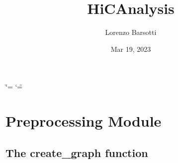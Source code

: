 \documentclass[letterpaper,10pt,english]{sphinxmanual}
\title{Hi\sphinxhyphen{}C\sphinxhyphen{}Analysis}
\date{Mar 19, 2023}
\author{Lorenzo Barsotti}
\begin{document}
\ifdefined\shorthandoff
  \ifnum\catcode`\=\string=\active\shorthandoff{=}\fi
  \ifnum\catcode`\"=\active{}\fi
\fi

\pagestyle{empty}
\sphinxmaketitle
\pagestyle{plain}
\sphinxtableofcontents
\pagestyle{normal}
\label{\detokenize{index::doc}}



\chapter{Preprocessing Module}
\label{\detokenize{index:preprocessing-module}}

\section{The create\_graph function}
\label{\detokenize{index:the-create-graph-function}}
\end{document}
